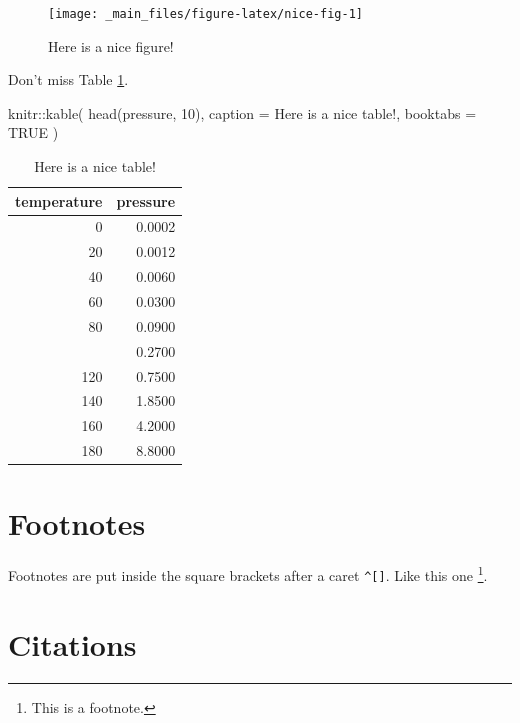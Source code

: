 \documentclass[
]{book}
\newenvironment{Shaded}{\begin{snugshade}}{\end{snugshade}}
\newcommand{\AttributeTok}[1]{\textcolor[rgb]{0.77,0.63,0.00}{#1}}
\newcommand{\ConstantTok}[1]{\textcolor[rgb]{0.00,0.00,0.00}{#1}}
\newcommand{\DecValTok}[1]{\textcolor[rgb]{0.00,0.00,0.81}{#1}}
\newcommand{\FunctionTok}[1]{\textcolor[rgb]{0.00,0.00,0.00}{#1}}
\newcommand{\NormalTok}[1]{#1}
\newcommand{\SpecialCharTok}[1]{\textcolor[rgb]{0.00,0.00,0.00}{#1}}
\newcommand{\StringTok}[1]{\textcolor[rgb]{0.31,0.60,0.02}{#1}}
\theoremstyle{definition}
\theoremstyle{definition}
\theoremstyle{definition}
\theoremstyle{definition}
\theoremstyle{remark}
\begin{document}
\begin{figure}

{\centering \texttt{[image: \_main\_files/figure-latex/nice-fig-1]} 

}

\caption{Here is a nice figure!}\label{fig:nice-fig}
\end{figure}

Don't miss Table \ref{tab:nice-tab}.

\begin{Shaded}
\begin{Highlighting}[]
\NormalTok{knitr}\SpecialCharTok{::}\FunctionTok{kable}\NormalTok{(}
  \FunctionTok{head}\NormalTok{(pressure, }\DecValTok{10}\NormalTok{), }\AttributeTok{caption =} \StringTok{\textquotesingle{}Here is a nice table!\textquotesingle{}}\NormalTok{,}
  \AttributeTok{booktabs =} \ConstantTok{TRUE}
\NormalTok{)}
\end{Highlighting}
\end{Shaded}

\begin{table}

\caption{\label{tab:nice-tab}Here is a nice table!}
\centering
\begin{tabular}[t]{rr}
\toprule
temperature & pressure\\
\midrule
0 & 0.0002\\
20 & 0.0012\\
40 & 0.0060\\
60 & 0.0300\\
80 & 0.0900\\
\addlinespace
100 & 0.2700\\
120 & 0.7500\\
140 & 1.8500\\
160 & 4.2000\\
180 & 8.8000\\
\bottomrule
\end{tabular}
\end{table}

\hypertarget{footnotes}{%
\section{Footnotes}\label{footnotes}}

Footnotes are put inside the square brackets after a caret \texttt{\^{}{[}{]}}. Like this one \footnote{This is a footnote.}.

\hypertarget{citations}{%
\section{Citations}\label{citations}}
\end{document}
